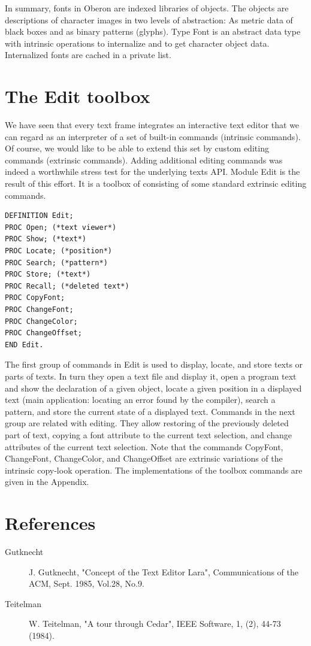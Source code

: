 In summary, fonts in Oberon are indexed libraries of objects. The objects are descriptions of
character images in two levels of abstraction: As metric data of black boxes and as binary patterns
(glyphs). Type Font is an abstract data type with intrinsic operations to internalize and to get
character object data. Internalized fonts are cached in a private list.

\section{The Edit toolbox}
We have seen that every text frame integrates an interactive text editor that we can regard as an
interpreter of a set of built-in commands (intrinsic commands). Of course, we would like to be able
to extend this set by custom editing commands (extrinsic commands). Adding additional editing
commands was indeed a worthwhile stress test for the underlying texts API. Module Edit is the
result of this effort. It is a toolbox of consisting of some standard extrinsic editing commands.
\begin{verbatim}
DEFINITION Edit;
PROC Open; (*text viewer*)
PROC Show; (*text*)
PROC Locate; (*position*)
PROC Search; (*pattern*)
PROC Store; (*text*)
PROC Recall; (*deleted text*)
PROC CopyFont;
PROC ChangeFont;
PROC ChangeColor;
PROC ChangeOffset;
END Edit.
\end{verbatim}

The first group of commands in Edit is used to display, locate, and store texts or parts of texts. In
turn they open a text file and display it, open a program text and show the declaration of a given
object, locate a given position in a displayed text (main application: locating an error found by the
compiler), search a pattern, and store the current state of a displayed text. Commands in the next
group are related with editing. They allow restoring of the previously deleted part of text, copying a
font attribute to the current text selection, and change attributes of the current text selection. Note
that the commands CopyFont, ChangeFont, ChangeColor, and ChangeOffset are extrinsic
variations of the intrinsic copy-look operation. The implementations of the toolbox commands are
given in the Appendix.

\section*{References}
\begin{description}
	\item[Gutknecht] J. Gutknecht, "Concept of the Text Editor Lara", Communications of the ACM, Sept. 1985, Vol.28, No.9.
	\item[Teitelman] W. Teitelman, "A tour through Cedar", IEEE Software, 1, (2), 44-73 (1984).
\end{description}
